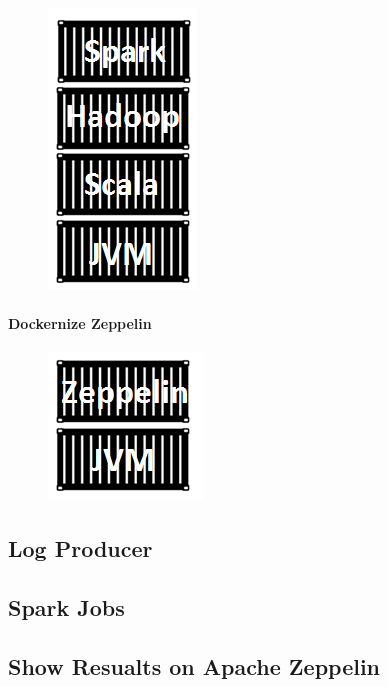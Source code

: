 \begin{figure}[h!]
	\centering
	\includegraphics[height=0.2\textheight]{fig01/SparkFinalContainer}
	\label{fig:FilialesEtClients}
\end{figure}
\paragraph{Dockernize Zeppelin}
\label{sec:sec01}
\begin{figure}[h!]
	\centering
	\includegraphics[height=0.2\textheight]{fig01/ZeppelinContainer}
	\label{fig:FilialesEtClients}
\end{figure}
\subsection{Log Producer}
\label{sec:sec01}
\subsection{Spark Jobs}
\label{sec:sec01}
\subsection{Show Resualts on Apache Zeppelin}
\label{sec:sec01}
